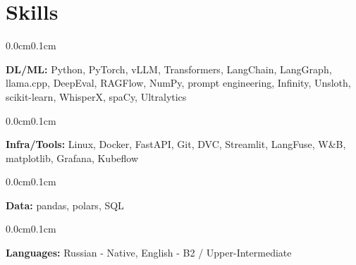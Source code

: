 \documentclass[12pt, letterpaper]{article}
\newenvironment{onecolentry}{
  \begin{adjustwidth}{0.0cm}{0.1cm}
}{
  \end{adjustwidth}
}
\begin{document}
\section{Skills}

\begin{onecolentry}
  \textbf{DL/ML:} Python, PyTorch, vLLM, Transformers, LangChain, LangGraph, llama.cpp, DeepEval, RAGFlow, NumPy, prompt engineering, Infinity, Unsloth, scikit-learn, WhisperX, spaCy, Ultralytics
\end{onecolentry}

\begin{onecolentry}
  \textbf{Infra/Tools:} Linux, Docker, FastAPI, Git, DVC, Streamlit, LangFuse, W\&B, matplotlib, Grafana, Kubeflow
\end{onecolentry}

\begin{onecolentry}
  \textbf{Data:} pandas, polars, SQL
\end{onecolentry}

\begin{onecolentry}
  \textbf{Languages:} Russian - Native, English - B2 / Upper-Intermediate
\end{onecolentry}
\end{document}
